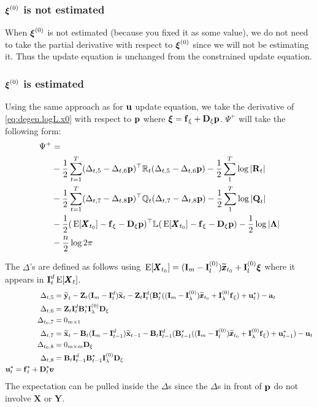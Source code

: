 \documentclass[]{article}
\def\uupsilon{\pmb{\upsilon}}
\def\xixi{\mbox{\boldmath $\xi$}}
\def\LAM{\mbox{\boldmath $\Lambda$}}
\def\LAMm{\mathbb{L}}
\def\UPS{\mbox{\boldmath $\Upsilon$}}
\def\XI{\mbox{\boldmath $\Xi$}}
\def\BB{\mbox{$\mathbf B$}}	\def\bb{\mbox{$\mathbf b$}} \def\Bb{\mbox{$\mathbf J$}} \def\Ba{\mbox{$\mathbf L$}} \def\Bm{\UPS}
\def\DD{\mbox{$\mathbf D$}}	\def\dd{\mbox{$\mathbf d$}}
\def\E{\,\textup{\textrm{E}}}
\def\II{\mbox{$\mathbf I$}} \def\ii{\mbox{$\mathbf i$}}
\def\QQ{\mbox{$\mathbf Q$}}	 \def\qq{\mbox{$\mathbf q$}} \def\Qb{\mbox{$\mathbf G$}}  \def\Qm{\mathbb{Q}}
\def\RR{\mbox{$\mathbf R$}}	 \def\rr{\mbox{$\mathbf r$}} \def\Rb{\mbox{$\mathbf H$}}	\def\Rm{\mathbb{R}}
\def\XX{\mbox{$\pmb{X}$}}	\def\xx{\mbox{$\pmb{x}$}}
\def\YY{\mbox{$\pmb{Y}$}}	\def\yy{\mbox{$\pmb{y}$}}
\def\ZZ{\mbox{$\mathbf Z$}}	\def\zz{\mbox{$\mathbf z$}}	\def\Zb{\mbox{$\mathbf M$}} \def\Za{\mbox{$\mathbf N$}} \def\Zm{\XI}
\def\hatxt{\widetilde{\mbox{$\mathbf x$}}_t}
\def\hatxtm{\widetilde{\mbox{$\mathbf x$}}_{t-1}}
\def\hatyt{\widetilde{\mbox{$\mathbf y$}}_t}
\begin{document}
\subsubsection{$\xixi^{(0)}$ is not estimated}
When $\xixi^{(0)}$ is not estimated (because you fixed it as some value), we do not need to take the partial derivative with respect to $\xixi^{(0)}$ since we will not be estimating it. Thus the update equation is unchanged from the constrained update equation.

\subsubsection{$\xixi^{(0)}$ is estimated}
Using the same approach as for  $\mbox{$\mathbf u$}$ update equation, we take the derivative of \ref{eq:degen.logL.x0} with respect to $\mbox{$\mathbf p$}$ where $\xixi=\ff_\xi+\DD_\xi\pp$.  $\Psi^+$ will take the following form:
\begin{equation}\label{eq:degen.logL.x0.0}
\begin{split}
\Psi^+ &=   \\
&-\frac{1}{2}\sum_{t=1}^T (\Delta_{t,5} - \Delta_{t,6}\pp)^\top\Rm_t(\Delta_{t,5} - \Delta_{t,6}\pp) - \frac{1}{2}\sum_1^T\log |\RR_t| \\
& -\frac{1}{2}\sum_{t=1}^T (\Delta_{t,7} - \Delta_{t,8}\pp)^\top\Qm_t(\Delta_{t,7} - \Delta_{t,8}\pp) - \frac{1}{2}\sum_1^T\log |\QQ_t| \\
& -\frac{1}{2} (\E[\XX_{t_0}] - \ff_\xi - \DD_\xi\pp)^\top\LAMm(\E[\XX_{t_0}] - \ff_\xi - \DD_\xi\pp) - \frac{1}{2}\log |\LAM| \\
& - \frac{n}{2}\log 2\pi \\
\end{split}
\end{equation}

The $\Delta$'s are defined as follows using $ \E[\XX_{t_0}]=(\II_m-\II_l^{(0)})\widetilde{\xx}_{t_0}+\II_l^{(0)}\xixi$ where it appears in $\II_t^d\E[\XX_t]$.
\begin{equation}\label{eq:degen.x0.update.Deltas}
\begin{split}
\Delta_{t,5}&=\hatyt - \ZZ_t(\II_m - \II_t^d)\hatxt - \ZZ_t\II_t^{d}(\BB^*_t((\II_m-\II_\lambda^{(0)})\widetilde{\xx}_{t_0}+\II_\lambda^{(0)} \ff_\xi) + \uu^*_t) - \aa_t \\
\Delta_{t,6}&= \ZZ_t\II_t^{d}\BB^*_t\II_\lambda^{(0)}\DD_\xi \\
\Delta_{t_0,7}&=0_{m\times 1} \\
\Delta_{t,7}&=\hatxt - \BB_t(\II_m - \II_{t-1}^d)\hatxtm - \BB_t\II_{t-1}^{d}(\BB^*_{t-1} ((\II_m-\II_l^{(0)})\widetilde{\xx}_{t_0}+\II_\lambda^{(0)} \ff_\xi) + \uu^*_{t-1}) - \uu_t \\
\Delta_{t_0,8}&=0_{m\times m} \DD_\xi\\
\Delta_{t,8}&=\BB_t\II_{t-1}^{d}\BB^*_{t-1}\II_\lambda^{(0)}\DD_\xi\\
\uu^*_t=\ff^*_t+\DD^*_t\uupsilon
\end{split}
\end{equation}
The expectation can be pulled inside the $\Delta$s since the $\Delta$s in front of $\mbox{$\mathbf p$}$ do not involve $\XX$ or $\YY$.
\end{document}
